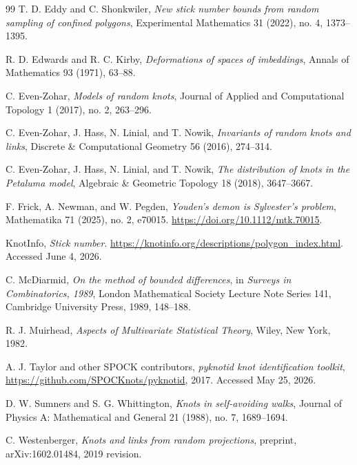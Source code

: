 \documentclass[11pt]{amsart}
\theoremstyle{remark}
\newcommand{\1}{\mathbf{1}}
\begin{document}
\begin{thebibliography}{99}
T. D. Eddy and C. Shonkwiler,
\emph{New stick number bounds from random sampling of confined polygons},
Experimental Mathematics 31 (2022), no. 4, 1373--1395.

R. D. Edwards and R. C. Kirby,
\emph{Deformations of spaces of imbeddings},
Annals of Mathematics 93 (1971), 63--88.

C. Even-Zohar,
\emph{Models of random knots},
Journal of Applied and Computational Topology 1 (2017), no. 2, 263--296.

C. Even-Zohar, J. Hass, N. Linial, and T. Nowik,
\emph{Invariants of random knots and links},
Discrete \& Computational Geometry 56 (2016), 274--314.

C. Even-Zohar, J. Hass, N. Linial, and T. Nowik,
\emph{The distribution of knots in the Petaluma model},
Algebraic \& Geometric Topology 18 (2018), 3647--3667.

F. Frick, A. Newman, and W. Pegden,
\emph{Youden's demon is Sylvester's problem},
Mathematika 71 (2025), no. 2, e70015.
\url{https://doi.org/10.1112/mtk.70015}.

KnotInfo,
\emph{Stick number}.
\url{https://knotinfo.org/descriptions/polygon_index.html}.
Accessed June 4, 2026.

C. McDiarmid,
\emph{On the method of bounded differences},
in \emph{Surveys in Combinatorics, 1989},
London Mathematical Society Lecture Note Series 141,
Cambridge University Press, 1989, 148--188.

R. J. Muirhead,
\emph{Aspects of Multivariate Statistical Theory},
Wiley, New York, 1982.

A. J. Taylor and other SPOCK contributors,
\emph{pyknotid knot identification toolkit},
\url{https://github.com/SPOCKnots/pyknotid}, 2017.
Accessed May 25, 2026.

D. W. Sumners and S. G. Whittington,
\emph{Knots in self-avoiding walks},
Journal of Physics A: Mathematical and General 21 (1988), no. 7, 1689--1694.

C. Westenberger,
\emph{Knots and links from random projections},
preprint, arXiv:1602.01484, 2019 revision.

\end{thebibliography}
\end{document}
